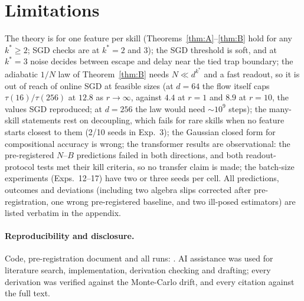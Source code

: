 \section{Limitations}
\label{sec:limits}
The theory is for one feature per skill (Theorems~\ref{thm:A}--\ref{thm:B} hold for any $k^*\ge2$; SGD checks are at $k^*=2$ and $3$); the SGD threshold is soft, and at $k^*=3$ noise decides between escape and delay near the tied trap boundary; the adiabatic $1/N$ law of Theorem~\ref{thm:B} needs $N\ll d^{k^*}$ and a fast readout, so it is out of reach of online SGD at feasible sizes (at $d=64$ the flow itself caps $\tau(16)/\tau(256)$ at $12.8$ as $r\to\infty$, against $4.4$ at $r=1$ and $8.9$ at $r=10$, the values SGD reproduced; at $d=256$ the law would need $\sim10^9$ steps); the many-skill statements rest on decoupling,
which fails for rare skills when no feature starts closest to them (2/10 seeds in Exp.~3); the Gaussian closed form for
compositional accuracy is wrong; the transformer results are observational: the pre-registered $N$--$B$ predictions failed in both directions, and both readout-protocol tests met their kill criteria, so no transfer claim is made; the batch-size experiments (Exps.~12--17) have two or three seeds per cell. All predictions, outcomes and deviations (including two algebra slips corrected after pre-registration, one wrong pre-registered baseline, and two
ill-posed estimators) are listed verbatim in the appendix.

\paragraph{Reproducibility and disclosure.} Code, pre-registration document and all runs: . AI assistance was used for
literature search, implementation, derivation checking and drafting; every derivation was verified against the Monte-Carlo drift,
and every citation against the full text.

